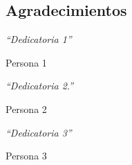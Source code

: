 
\begin{comment}
\begin{acknowledgements}

También quisiera reconocer a ... por ...CONACYT,  PAPIIT / etc.
\end{acknowledgements}
\end{comment}

\begin{alwayssingle}
	{
		\pagestyle{empty}
		\vspace{1.5cm}
		{\chapter*{Agradecimientos}
			\noindent 
			\textit{``Dedicatoria 1''}
			\begin{flushright}
				Persona 1
			\end{flushright}
			\noindent 
			\textit{``Dedicatoria 2.''}
			\begin{flushright}
				Persona 2
			\end{flushright}
			\noindent 
			\textit{``Dedicatoria 3''}
			\begin{flushright}
				Persona 3
			\end{flushright}
			
		}
	}
	
\end{alwayssingle}



